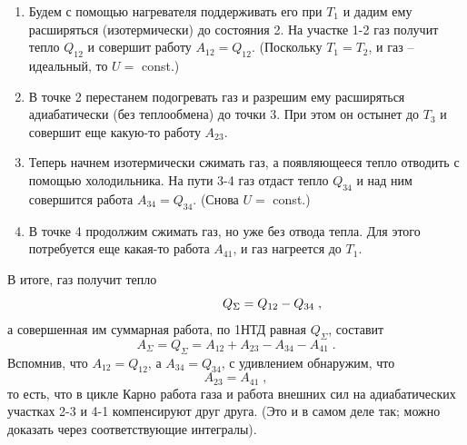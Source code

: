 \begin{enumerate}
\item Будем с помощью нагревателя поддерживать его при $T_1$ и дадим ему расширяться (изотермически) до состояния 2. На участке 1-2 газ получит тепло $Q_{12}$ и совершит работу $A_{12}=Q_{12}$. (Поскольку $T_1=T_2$, и газ -- идеальный, то $U=$ const.)
\item В точке 2 перестанем подогревать газ и разрешим ему расширяться адиабатически (без теплообмена) до точки 3. При этом он остынет до $T_3$ и совершит еще какую-то работу $A_{23}$.
\item Теперь начнем изотермически сжимать газ, а появляющееся тепло отводить с помощью холодильника. На пути 3-4 газ отдаст тепло $Q_{34}$ и над ним совершится работа $A_{34}=Q_{34}$. (Снова $U=$ const.)
\item В точке 4 продолжим сжимать газ, но уже без отвода тепла. Для этого потребуется еще какая-то работа $A_{41}$, и газ нагреется до $T_1$.
\end{enumerate}
В итоге, газ получит тепло\vspace{-12mm}
\begin{displaymath}
\hspace{20mm}Q_\Sigma=Q_{12}-Q_{34}\;,
\end{displaymath}
а совершенная им суммарная работа, по 1НТД равная $Q_\Sigma$,  составит
\begin{displaymath}
A_\Sigma=Q_\Sigma=A_{12}+A_{23}-A_{34}-A_{41}\;.
\end{displaymath}
Вспомнив, что  $A_{12}=Q_{12}$, а $A_{34}=Q_{34}$, с удивлением обнаружим, что
\begin{displaymath}
A_{23}=A_{41}\;,
\end{displaymath}
то есть, что в цикле Карно работа газа и работа внешних сил на адиа\-ба\-ти\-чес\-ких участках 2-3 и 4-1 компенсируют друг друга. (Это и в самом деле так; можно доказать через соответствующие интегралы).

